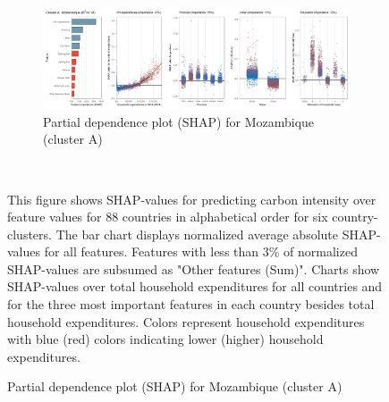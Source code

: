 \begin{figure}[ht!]
    \\
    \vspace{0.5cm}
   \begin{subfigure}[b]{\textwidth}         
         \centering
         \caption{Partial dependence plot (SHAP) for Mozambique (cluster A)}
         \label{fig:5b_MOZ}
         \includegraphics[width=\textwidth]{Figure 5b/Figure_5b_MOZ}
         \end{subfigure}
    \\
    \vspace{0.5cm}
   
    \begin{subcaption2}
     This figure shows SHAP-values for predicting carbon intensity over feature values for 88 countries in alphabetical order for six country-clusters. The bar chart displays normalized average absolute SHAP-values for all features. Features with less than 3\% of normalized SHAP-values are subsumed as "Other features (Sum)". Charts show SHAP-values over total household expenditures for all countries and for the three most important features in each country besides total household expenditures. Colors represent household expenditures with blue (red) colors indicating lower (higher) household expenditures.
     \end{subcaption2}
\end{figure}

